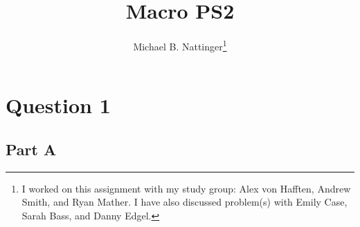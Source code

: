 \documentclass[11pt]{article} %
\title{Macro PS2}
\author{Michael B. Nattinger\footnote{I worked on this assignment with my study group: Alex von Hafften, Andrew Smith, and Ryan Mather. I have also discussed problem(s) with Emily Case, Sarah Bass, and Danny Edgel.}}
\begin{document}
\maketitle
\section{Question 1}
\subsection{Part A}
%
%
%
%
%
\end{document}
